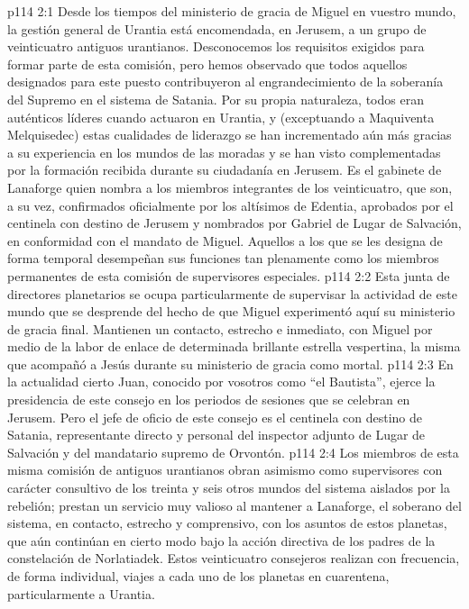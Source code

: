 \vs p114 2:1 Desde los tiempos del ministerio de gracia de Miguel en vuestro mundo, la gestión general de Urantia está encomendada, en Jerusem, a un grupo de veinticuatro antiguos urantianos. Desconocemos los requisitos exigidos para formar parte de esta comisión, pero hemos observado que todos aquellos designados para este puesto contribuyeron al engrandecimiento de la soberanía del Supremo en el sistema de Satania. Por su propia naturaleza, todos eran auténticos líderes cuando actuaron en Urantia, y (exceptuando a Maquiventa Melquisedec) estas cualidades de liderazgo se han incrementado aún más gracias a su experiencia en los mundos de las moradas y se han visto complementadas por la formación recibida durante su ciudadanía en Jerusem. Es el gabinete de Lanaforge quien nombra a los miembros integrantes de los veinticuatro, que son, a su vez, confirmados oficialmente por los altísimos de Edentia, aprobados por el centinela con destino de Jerusem y nombrados por Gabriel de Lugar de Salvación, en conformidad con el mandato de Miguel. Aquellos a los que se les designa de forma temporal desempeñan sus funciones tan plenamente como los miembros permanentes de esta comisión de supervisores especiales.
\vs p114 2:2 Esta junta de directores planetarios se ocupa particularmente de supervisar la actividad de este mundo que se desprende del hecho de que Miguel experimentó aquí su ministerio de gracia final. Mantienen un contacto, estrecho e inmediato, con Miguel por medio de la labor de enlace de determinada brillante estrella vespertina, la misma que acompañó a Jesús durante su ministerio de gracia como mortal.
\vs p114 2:3 En la actualidad cierto Juan, conocido por vosotros como “el Bautista”, ejerce la presidencia de este consejo en los periodos de sesiones que se celebran en Jerusem. Pero el jefe de oficio de este consejo es el centinela con destino de Satania, representante directo y personal del inspector adjunto de Lugar de Salvación y del mandatario supremo de Orvontón.
\vs p114 2:4 Los miembros de esta misma comisión de antiguos urantianos obran asimismo como supervisores con carácter consultivo de los treinta y seis otros mundos del sistema aislados por la rebelión; prestan un servicio muy valioso al mantener a Lanaforge, el soberano del sistema, en contacto, estrecho y comprensivo, con los asuntos de estos planetas, que aún continúan en cierto modo bajo la acción directiva de los padres de la constelación de Norlatiadek. Estos veinticuatro consejeros realizan con frecuencia, de forma individual, viajes a cada uno de los planetas en cuarentena, particularmente a Urantia.

